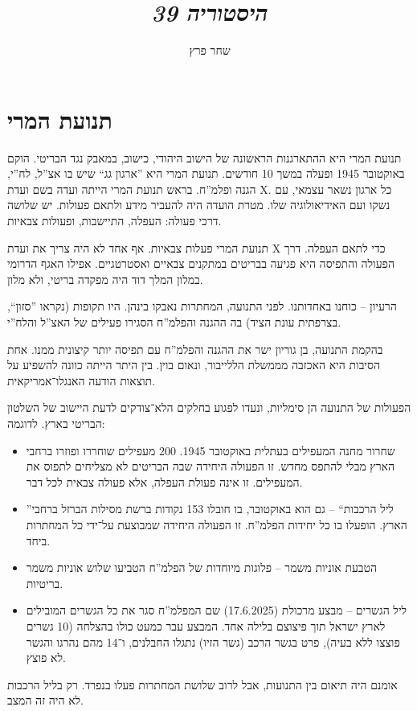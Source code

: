\documentclass[]{../../../../tex/classes/styledArticle}
\author{שחר פרץ}
\title{\textit{היסטוריה 39}}
\begin{document}
	\maketitle
	\section{תנועת המרי}
	תנועת המרי היא ההתארגנות הראשונה של הישוב היהודי, כישוב, במאבק נגד הבריטי. הוקם באוקטובר 1945 ופעלה במשך 10 חודשים. תנועת המרי היא ''ארגון גג`` שיש בו אצ''ל, לח''י, הגנה ופלמ''ח. בראש תנועת המרי הייתה ועדה בשם ועדת X. כל ארגון נשאר עצמאי, עם נשקו ועם האידיאולוגיה שלו. מטרת הועדה היה להעביר מידע ולתאם פעולות. יש שלושה דרכי פעולה: העפלה, התיישבות, ופעולות צבאיות. 
	
	תנועת המרי פעלות צבאיות. אף אחד לא היה צריך את ועדת X כדי לתאם העפלה. דרך הפעולה והתפיסה היא פגיעה בבריטים במתקנים צבאיים ואסטרטגיים. אפילו האגף הדרומי במלון המלך דוד היה מפקדה בריטי, ולא מלון. 
	
	הרעיון – כוחנו באחדותנו. לפני התנועה, המחתרות נאבקו בינהן. היו תקופות (נקראו ''סזון``, בצרפתית עונת הציד) בה ההגנה והפלמ''ח הסגירו פעילים של האצ''ל והלח''י. 
	
	בהקמת התנועה, בן גוריון ישר את ההגנה והפלמ''ח עם תפיסה יותר קיצונית ממנו. אחת הסיבות היא האכזבה מממשלת הללייבור, ונאום בוין. בין היתר הייתה כוונה להשפיע על תוצאות הודעה האנגלו־אמריקאית. 
	
	הפעולות של התנועה הן סימליות, ונעדו לפגוע בחלקים הלא־צודקים לדעת היישוב של השלטון הבריטי בארץ. לדוגמה: 
	\begin{itemize}
		\item שחרור מחנה המעפילים בעתלית באוקטובר 1945. 200 מעפילים שוחררו ופוזרו ברחבי הארץ מבלי להתפס מחדש. זו הפעולה היחידה שבה הבריטים לא מצליחים לתפוס את המעפילים. זו אינה פעולת העפלה, אלא פעולה צבאית לכל דבר. 
		\item ''ליל הרכבות`` – גם הוא באוקטובר, בו חובלו 153 נקודות ברשת מסילות הברזל ברחבי הארץ. הופעלו בו כל יחידות הפלמ''ח. זו הפעולה היחידה שמבוצעת על־ידי כל המחתרות ביחד. 
		\item הטבעת אוניות משמר – פלוגות מיוחדות של הפלמ''ח הטביעו שלוש אוניות משמר בריטיות. 
		\item ליל הגשרים – מבצע מרכולת (17.6.2025) שם המפלמ''ח סגר את כל הגשרים המובילים לארץ ישראל תוך פיצוצם בלילה אחד. המבצע עבר כמעט כולו בהצלחה (10 גשרים פוצצו ללא בעיה), פרט בגשר הרכב (גשר הזיו) נתגלו החבלנים, ו־14 מהם נהרגו והגשר לא פוצץ. 
	\end{itemize}
	
	אומנם היה תיאום בין התנועות, אבל לרוב שלושת המחתרות פעלו בנפרד. רק בליל הרכבות לא היה זה המצב. 
	
\end{document}
